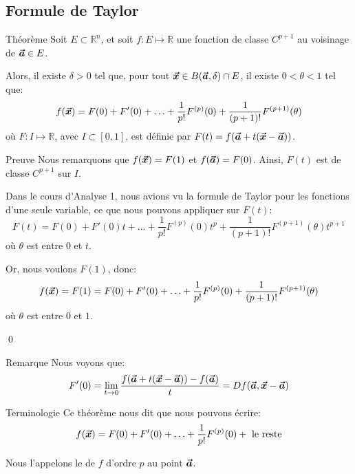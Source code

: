 \documentclass[a4paper]{article}
\begin{document}
\subsection{Formule de Taylor}
\begin{parag}{Théorème}
    Soit $E \subset \mathbb{R}^n$, et soit $f : E \mapsto \mathbb{R}$ une fonction de classe $C^{p+1}$ au voisinage de $\bm{\protect\vec{a}} \in E$. 

    Alors, il existe $\delta > 0$ tel que, pour tout $\bvec{x} \in B\left(\bvec{a}, \delta\right) \cap E$, il existe $0 < \theta < 1$ tel que: 
    \[f\left(\bvec{x}\right) = F\left(0\right) + F'\left(0\right) + \ldots + \frac{1}{p!} F^{\left(p\right)}\left(0\right) + \frac{1}{\left(p+1\right)!}F^{\left(p+1\right)}\left(\theta\right)\]
    où $F: I \mapsto \mathbb{R}$, avec $I \subset \left[0, 1\right]$, est définie par $F\left(t\right) = f\left(\bvec{a} + t\left(\bvec{x} - \bvec{a}\right)\right)$.

    \begin{subparag}{Preuve}
        Nous remarquons que $f\left(\bvec{x}\right) = F\left(1\right)$ et $f\left(\bvec{a}\right) = F\left(0\right)$. Ainsi, $F\left(t\right)$ est de classe $C^{p+1}$ sur $I$. 

        Dans le cours d'Analyse 1, nous avions vu la formule de Taylor pour les fonctions d'une seule variable, ce que nous pouvons appliquer sur $F\left(t\right)$: 
        \[F\left(t\right) = F\left(0\right) + F'\left(0\right)t + \ldots + \frac{1}{p!} F^{\left(p\right)}\left(0\right)t^p + \frac{1}{\left(p+1\right)!} F^{\left(p+1\right)}\left(\theta\right)t^{p+1}\]
        où $\theta$ est entre $0$ et $t$.

        Or, nous voulons $F\left(1\right)$, donc: 
        \[f\left(\bvec{x}\right) = F\left(1\right) = F\left(0\right) + F'\left(0\right) + \ldots + \frac{1}{p!}F^{\left(p\right)}\left(0\right) + \frac{1}{\left(p+1\right)!}F^{\left(p+1\right)}\left(\theta\right)\]
        où $\theta$ est entre $0$ et $1$.

        \qed
    \end{subparag}
    
    \begin{subparag}{Remarque}
        Nous voyons que: 
        \[F'\left(0\right) = \lim_{t \to 0} \frac{f\left(\bvec{a} + t\left(\bvec{x} - \bvec{a}\right)\right) - f\left(\bvec{a}\right)}{t} = Df\left(\bvec{a}, \bvec{x} - \bvec{a}\right)\]
        
    \end{subparag}
    
    \begin{subparag}{Terminologie}
        Ce théorème nous dit que nous pouvons écrire:
        \[f\left(\bvec{x}\right) = F\left(0\right) + F'\left(0\right) + \ldots + \frac{1}{p!} F^{\left(p\right)}\left(0\right) + \text{ le reste}\]

        Nous l'appelons le  de $f$ d'ordre $p$ au point $\bm{\protect\vec{a}}$.
    \end{subparag}
\end{parag}
\end{document}
